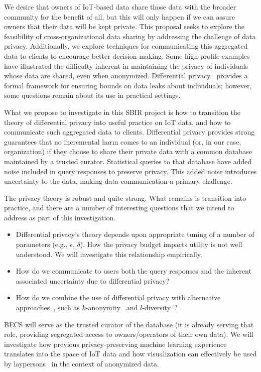 We desire that owners of IoT-based data share those data with the broader community for the benefit of all, but this will only happen if we can assure owners that their data will be kept private.
This proposal seeks to explore the feasibility of cross-organizational
data sharing by addressing the challenge of data privacy.
Additionally, we explore techniques for communicating this aggregated data to clients to encourage better decision-making.  Some high-profile examples~\cite{bz06,bk07} have illustrated the difficulty inherent in maintaining the privacy of individuals whose data are shared, even when anonymized.
Differential privacy~\cite{dwork11,dr14} provides a formal framework for ensuring bounds on data leaks about individuals; however, some questions remain about its use in practical settings.

What we propose to investigate in this SBIR project is how to transition
the theory of differential privacy into useful practice on IoT data, and how to communicate such aggregated data to clients.  
Differential privacy provides strong guarantees that no incremental harm comes to an individual (or, in our case, organization) if they choose to share their private data with a common database maintained by a trusted curator. Statistical queries to that database have added noise included in query responses to preserve privacy.
This added noise introduces uncertainty to the data, making data communication a primary challenge. 

The privacy theory is robust and quite strong.  What remains is transition into
practice, and there are a number of interesting questions that we intend
to address as part of this investigation.
\begin{itemize}
\item Differential privacy's theory depends upon appropriate tuning of a number
of parameters (e.g., $\epsilon$, $\delta$).  How the privacy budget impacts
utility is not well understood.  We will investigate this relationship empirically.
\item How do we communicate to users both the query responses and the
inherent associated uncertainty due to differential privacy?
\item How do we combine the use of differential privacy with alternative
approaches~\cite{ct13}, such as $k$-anonymity~\cite{samarati01,sweeney02} and
$l$-diversity~\cite{mkgv07}?
\end{itemize}
BECS will serve as the trusted curator of the database (it is already serving
that role, providing segregated access to owners/operators of their own data).
We will investigate how previous privacy-preserving machine learning
experience~\cite{acgmmtz16,ss15} translates into the space of IoT data
and how visualization can effectively be used by
laypersons~\cite{ottley2012visually} in the context of anonymized data.
